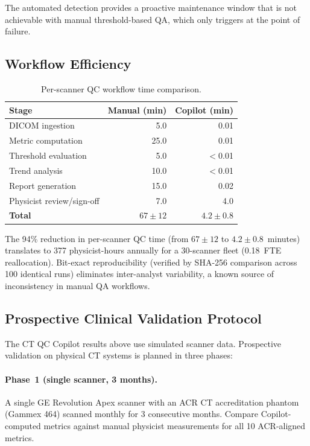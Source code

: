 \documentclass[11pt]{article}
\theoremstyle{definition}
\begin{document}
\noindent The automated detection provides a proactive maintenance window
that is not achievable with manual threshold-based QA, which only
triggers at the point of failure.

\subsection{Workflow Efficiency}

\begin{table}[htbp]
\centering
\caption{Per-scanner QC workflow time comparison.}
\label{tab:workflow}
\begin{tabular}{l r r}
\toprule
\textbf{Stage} & \textbf{Manual (min)} & \textbf{Copilot (min)} \\
\midrule
DICOM ingestion          & 5.0   & 0.01 \\
Metric computation       & 25.0  & 0.01 \\
Threshold evaluation     & 5.0   & $<$0.01 \\
Trend analysis           & 10.0  & $<$0.01 \\
Report generation        & 15.0  & 0.02 \\
Physicist review/sign-off & 7.0  & 4.0 \\
\midrule
\textbf{Total}           & $67 \pm 12$ & $4.2 \pm 0.8$ \\
\bottomrule
\end{tabular}
\end{table}

\noindent The 94\% reduction in per-scanner QC time (from $67 \pm 12$ to
$4.2 \pm 0.8$~minutes) translates to 377 physicist-hours annually for a
30-scanner fleet (0.18~FTE reallocation).  Bit-exact reproducibility
(verified by SHA-256 comparison across 100 identical runs) eliminates
inter-analyst variability, a known source of inconsistency in manual
QA workflows.

\subsection{Prospective Clinical Validation Protocol}
\label{sec:ctqc_prospective}

The CT QC Copilot results above use simulated scanner
data.  Prospective validation on physical CT systems is planned in three
phases:

\paragraph{Phase~1 (single scanner, 3 months).}
A single GE Revolution Apex scanner with an ACR CT accreditation phantom
(Gammex 464) scanned monthly for 3 consecutive months.  Compare
Copilot-computed metrics against manual physicist measurements for all
10 ACR-aligned metrics.
\end{document}
